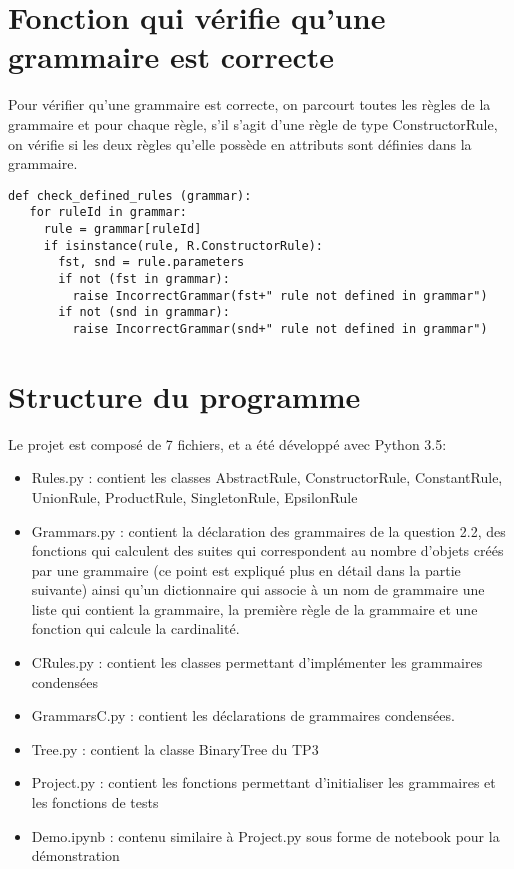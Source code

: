 \documentclass[a4paper, titlepage]{article}
\begin{document}
\section{Fonction qui vérifie qu'une grammaire est correcte}

Pour vérifier qu'une grammaire est correcte, on parcourt toutes les
règles de la grammaire et pour chaque règle, s'il s'agit d'une règle
de type ConstructorRule, on vérifie si les deux règles qu'elle possède
en attributs sont définies dans la grammaire.

\begin{lstlisting}
def check_defined_rules (grammar):
   for ruleId in grammar:
     rule = grammar[ruleId]
     if isinstance(rule, R.ConstructorRule):
       fst, snd = rule.parameters
       if not (fst in grammar):
         raise IncorrectGrammar(fst+" rule not defined in grammar")
       if not (snd in grammar):
         raise IncorrectGrammar(snd+" rule not defined in grammar")
\end{lstlisting}

\section {Structure du programme}

Le projet est composé de 7 fichiers, et a été développé avec Python 3.5:\\
\begin{itemize}
\item Rules.py : contient les classes AbstractRule, ConstructorRule,
  ConstantRule, UnionRule, ProductRule, SingletonRule, EpsilonRule\\
\item Grammars.py : contient la déclaration des grammaires de la
  question 2.2, des fonctions qui calculent des suites qui
  correspondent au nombre d'objets créés par une grammaire (ce point
  est expliqué plus en détail dans la partie suivante) ainsi qu'un dictionnaire qui associe à un nom de
  grammaire une liste qui contient la grammaire, la première règle de
  la grammaire et une fonction qui calcule la cardinalité.\\
\item CRules.py : contient les classes permettant d'implémenter les
  grammaires condensées\\
\item GrammarsC.py : contient les déclarations de grammaires
  condensées.\\
\item Tree.py : contient la classe BinaryTree du TP3\\
\item Project.py : contient les fonctions permettant d'initialiser les
  grammaires et les fonctions de tests\\
\item Demo.ipynb : contenu similaire à Project.py sous forme de
  notebook pour la démonstration\\
  
\end{itemize}
\end{document}
